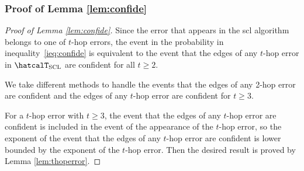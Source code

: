\documentclass[11pt,onecolumn]{article}
\begin{document}
\subsubsection{Proof of Lemma \ref{lem:confide}}
\begin{proof}[Proof of Lemma \ref{lem:confide}]
	Since the error that appears in the \ac{scl} algorithm belongs to one of $t$-hop errors, the event in the probability in inequality~\eqref{ieq:confide} is equivalent to the event that the edges of any $t$-hop error in $\hatcalT_{\rm{SCL}}$ are confident for all $t\geq 2$.

	We take different methods to handle the events that the edges of any 2-hop error are confident and the edges of any $t$-hop error are confident for $t\geq 3$.

	For a $t$-hop error with $t\geq 3$, the event that the edges of any $t$-hop error are confident is included in the event of the appearance of the $t$-hop error, so the exponent of the event that the edges of 
	any $t$-hop error are confident is lower bounded by the exponent of the $t$-hop error. Then the desired result is proved by Lemma \ref{lem:thoperror}.


\end{proof}
\end{document}
